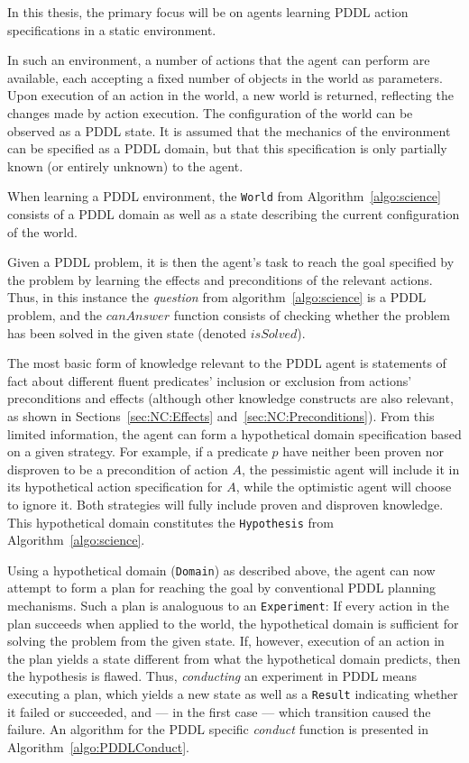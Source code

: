\documentclass[../Master.tex]{subfiles}
\begin{document}
In this thesis, the primary focus will be on agents learning PDDL action specifications in a static environment.

In such an environment, a number of actions that the agent can perform are available, each accepting a fixed number of objects in the world as parameters. Upon execution of an action in the world, a new world is returned, reflecting the changes made by action execution. The configuration of the world can be observed as a PDDL state. It is assumed that the mechanics of the environment can be specified as a PDDL domain, but that this specification is only partially known (or entirely unknown) to the agent. 

When learning a PDDL environment, the \texttt{World} from Algorithm~\ref{algo:science} consists of a PDDL domain as well as a state describing the current configuration of the world.

Given a PDDL problem, it is then the agent's task to reach the goal specified by the problem by learning the effects and preconditions of the relevant actions. Thus, in this instance the \textit{question} from algorithm~\ref{algo:science} is a PDDL problem, and the $canAnswer$ function consists of checking whether the problem has been solved in the given state (denoted $isSolved$).

The most basic form of knowledge relevant to the PDDL agent is statements of fact about different fluent predicates' inclusion or exclusion from actions' preconditions and effects (although other knowledge constructs are also relevant, as shown in Sections~\ref{sec:NC:Effects} and~\ref{sec:NC:Preconditions}). From this limited information, the agent can form a hypothetical domain specification based on a given strategy. For example, if a predicate $p$ have neither been proven nor disproven to be a precondition of action $A$, the pessimistic agent will include it in its hypothetical action specification for $A$, while the optimistic agent will choose to ignore it. Both strategies will fully include proven and disproven knowledge. This hypothetical domain constitutes the \texttt{Hypothesis} from Algorithm~\ref{algo:science}.

Using a hypothetical domain (\texttt{Domain}) as described above, the agent can now attempt to form a plan for reaching the goal by conventional PDDL planning mechanisms. Such a plan is analoguous to an \texttt{Experiment}: If every action in the plan succeeds when applied to the world, the hypothetical domain is sufficient for solving the problem from the given state. If, however, execution of an action in the plan yields a state different from what the hypothetical domain predicts, then the hypothesis is flawed. Thus, \emph{conducting} an experiment in PDDL means executing a plan, which yields a new state as well as a \texttt{Result} indicating whether it failed or succeeded, and --- in the first case --- which transition caused the failure. An algorithm for the PDDL specific \textit{conduct} function is presented in Algorithm~\ref{algo:PDDLConduct}. 
\end{document}
